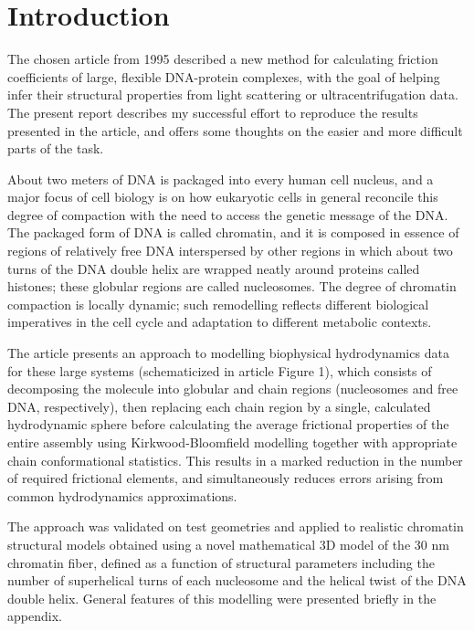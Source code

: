 

\section{Introduction}

The chosen article from 1995\supercite{Robert1995} described a new method for calculating friction coefficients of large, flexible DNA-protein complexes, with the goal of helping infer their structural properties from light scattering or ultracentrifugation data. The present report describes my successful effort to reproduce the results presented in the article, and offers some thoughts on the easier and more difficult parts of the task.

About two meters of DNA is packaged into every human cell nucleus, and a major focus of cell biology is on how eukaryotic cells in general reconcile this degree of compaction with the need to access the genetic message of the DNA. The packaged form of DNA is called chromatin, and it is composed in essence of regions of relatively free DNA interspersed by other regions in which about two turns of the DNA double helix are wrapped neatly around proteins called histones; these globular regions are called nucleosomes. The degree of chromatin compaction is locally dynamic; such remodelling reflects different biological imperatives in the cell cycle and adaptation to different metabolic contexts\supercite{Tian2016}.

The article presents an approach to modelling biophysical hydrodynamics data for these large systems (schematicized in article Figure 1), which consists of decomposing the molecule into globular and chain regions (nucleosomes and free DNA, respectively), then replacing each chain region by a single, calculated hydrodynamic sphere before calculating the average frictional properties of the entire assembly using Kirkwood-Bloomfield modelling\supercite{Bloomfield1977} together with appropriate chain conformational statistics. This results in a marked reduction in the number of required frictional elements, and simultaneously reduces errors arising from common hydrodynamics approximations.

The approach was validated on test geometries and applied to realistic chromatin structural models obtained using a novel mathematical 3D model of the 30 nm chromatin fiber, defined as a function of structural parameters including the number of superhelical turns of each nucleosome and the helical twist of the DNA double helix. General features of this modelling were presented briefly in the appendix.

